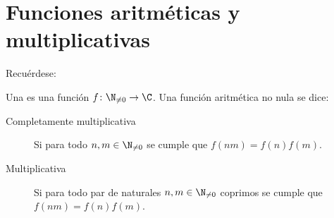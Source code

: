 \documentclass[11pt, reqno]{amsart}
\begin{document}

\section{Funciones aritméticas y multiplicativas}
Recuérdese:
\begin{mydef}
	Una  es una función $f \colon \N_{\ne 0} \to \C$.
	Una función aritmética no nula se dice:
	\begin{description}
		\item[Completamente multiplicativa] Si para todo $n, m \in \N_{\ne 0}$ se cumple que $f(nm) = f(n)f(m)$.
		\item[Multiplicativa] Si para todo par de naturales $n, m \in \N_{\ne 0}$ coprimos se cumple que $f(nm) = f(n)f(m)$.
	\end{description}
\end{mydef}
\end{document}
